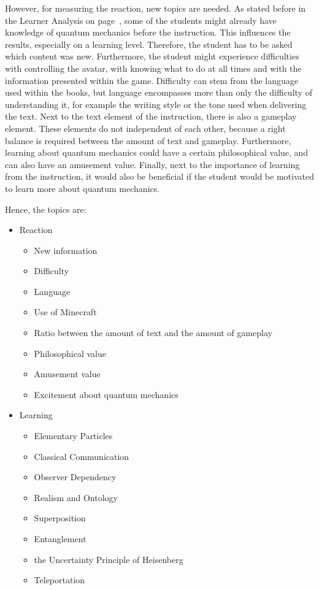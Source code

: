 \documentclass[11pt,twoside]{report} %
\begin{document}
However, for measuring the reaction, new topics are needed. As stated before in the Learner Analysis on page~\pageref{ch:learneranalysis}, some of the students might already have knowledge of quantum mechanics before the instruction. This influences the results, especially on a learning level. Therefore, the student has to be asked which content was new. Furthermore, the student might experience difficulties with controlling the avatar, with knowing what to do at all times and with the information presented within the game. Difficulty can stem from the language used within the books, but language encompasses more than only the difficulty of understanding it, for example the writing style or the tone used when delivering the text. Next to the text element of the instruction, there is also a gameplay element. These elements do not independent of each other, because a right balance is required between the amount of text and gameplay. Furthermore, learning about quantum mechanics could have a certain philosophical value, and can also have an amusement value. Finally, next to the importance of learning from the instruction, it would also be beneficial if the student would be motivated to learn more about quantum mechanics.

Hence, the topics are:
\begin{itemize}
	\item Reaction
	\begin{itemize}
		\item New information
		\item Difficulty
		\item Language
		\item Use of Minecraft
		\item Ratio between the amount of text and the amount of gameplay
		\item Philosophical value
		\item Amusement value
		\item Excitement about quantum mechanics
	\end{itemize}
	\item Learning
	\begin{itemize}
		\item Elementary Particles
		\item Classical Communication
		\item Observer Dependency
		\item Realism and Ontology
		\item Superposition
		\item Entanglement
		\item the Uncertainty Principle of Heisenberg
		\item Teleportation
	\end{itemize}
\end{itemize}
\end{document}
